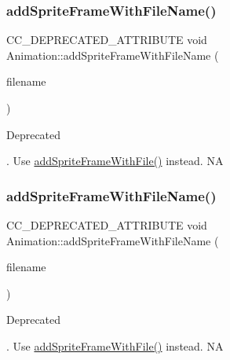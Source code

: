 \subsubsection{\texorpdfstring{add\+Sprite\+Frame\+With\+File\+Name()}{addSpriteFrameWithFileName()}\hspace{0.1cm}{\footnotesize\ttfamily [1/2]}}
{\footnotesize\ttfamily C\+C\+\_\+\+D\+E\+P\+R\+E\+C\+A\+T\+E\+D\+\_\+\+A\+T\+T\+R\+I\+B\+U\+TE void Animation\+::add\+Sprite\+Frame\+With\+File\+Name (\begin{DoxyParamCaption}\item[{const std\+::string \&}]{filename }\end{DoxyParamCaption})\hspace{0.3cm}{\ttfamily [inline]}}

\begin{DoxyRefDesc}{Deprecated}
\item[\hyperlink{deprecated__deprecated000018}{Deprecated}]. Use \hyperlink{classAnimation_ab57ae7ddaf2adca5d944d931e892d203}{add\+Sprite\+Frame\+With\+File()} instead.  NA \end{DoxyRefDesc}
\mbox{\label{classAnimation_a26bbe80cf512690329b5c50f7dc567e8}} 
\subsubsection{\texorpdfstring{add\+Sprite\+Frame\+With\+File\+Name()}{addSpriteFrameWithFileName()}\hspace{0.1cm}{\footnotesize\ttfamily [2/2]}}
{\footnotesize\ttfamily C\+C\+\_\+\+D\+E\+P\+R\+E\+C\+A\+T\+E\+D\+\_\+\+A\+T\+T\+R\+I\+B\+U\+TE void Animation\+::add\+Sprite\+Frame\+With\+File\+Name (\begin{DoxyParamCaption}\item[{const std\+::string \&}]{filename }\end{DoxyParamCaption})\hspace{0.3cm}{\ttfamily [inline]}}

\begin{DoxyRefDesc}{Deprecated}
\item[\hyperlink{deprecated__deprecated000248}{Deprecated}]. Use \hyperlink{classAnimation_ab57ae7ddaf2adca5d944d931e892d203}{add\+Sprite\+Frame\+With\+File()} instead.  NA \end{DoxyRefDesc}
\mbox{\label{classAnimation_aae5886a21a9c86e88269e35aa58a7ab1}} 
